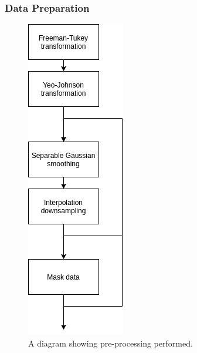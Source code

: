             \subsubsection{Data Preparation} \label{sec:pca_data_driven_surrogate_signal_extraction_methods_for_dynamic_pet_evaluation_data_preparation}
                \begin{figure}
                    \centering
                    
                    \includegraphics[width=0.4\linewidth]{figures/data_driven_surrogate_signal_extraction_methods_1_pre_processing.png}
                    
                    \captionsetup{singlelinecheck=false}
                    \caption{
                        A diagram showing pre-processing performed.
                    }
                    \label{fig:pca_data_driven_surrogate_signal_extraction_methods_for_dynamic_pet_evaluation_data_preparation_pre_processing}
                \end{figure}
                
